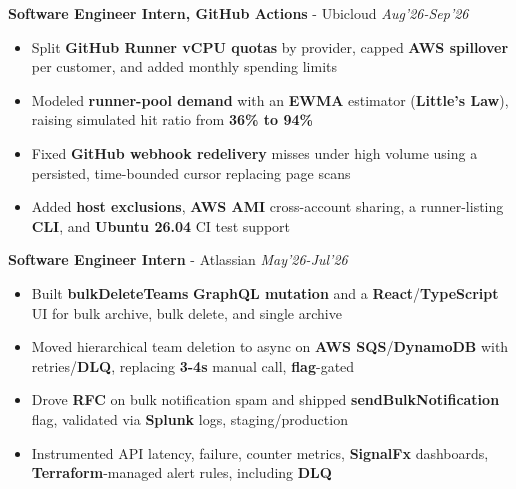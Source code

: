 \documentclass[10pt]{extarticle}
\begin{document}
\begin{center}
\textbf{Software Engineer Intern, GitHub Actions} - Ubicloud
\hfill\hfill\textit{Aug'26-Sep'26}
\end{center}
\vspace{-2mm}
\begin{itemize}[leftmargin=1.5mm, itemsep=0pt, topsep=0pt]
  \item Split \textbf{GitHub Runner vCPU quotas} by provider, capped \textbf{AWS spillover} per customer, and added monthly spending limits
  \item Modeled \textbf{runner-pool demand} with an \textbf{EWMA} estimator (\textbf{Little's Law}), raising simulated hit ratio from \textbf{36\% to 94\%}
  \item Fixed \textbf{GitHub webhook redelivery} misses under high volume using a persisted, time-bounded cursor replacing page scans
  \item Added \textbf{host exclusions}, \textbf{AWS AMI} cross-account sharing, a runner-listing \textbf{CLI}, and \textbf{Ubuntu 26.04} CI test support
\end{itemize}

\vspace{1mm}

\begin{center}
\textbf{Software Engineer Intern} - Atlassian
\hfill\hfill\textit{May'26-Jul'26}
\end{center}
\vspace{-2mm}
\begin{itemize}[leftmargin=1.5mm, itemsep=0pt, topsep=0pt]
  \item Built \textbf{bulkDeleteTeams} \textbf{GraphQL mutation} and a \textbf{React}/\textbf{TypeScript} UI for bulk archive, bulk delete, and single archive
  \item Moved hierarchical team deletion to async on \textbf{AWS SQS}/\textbf{DynamoDB} with retries/\textbf{DLQ}, replacing \textbf{3-4s} manual call, \textbf{flag}-gated
  \item Drove \textbf{RFC} on bulk notification spam and shipped \textbf{sendBulkNotification} flag, validated via \textbf{Splunk} logs, staging/production
  \item Instrumented API latency, failure, counter metrics, \textbf{SignalFx} dashboards, \textbf{Terraform}-managed alert rules, including \textbf{DLQ}
\end{itemize}

\vspace{1mm}
\end{document}
